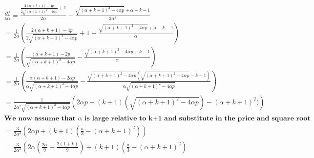 \begin{align*}
\frac{\partial f}{\partial \alpha} = \frac{\frac{2 (\alpha+k+1)-4 p}{2 \sqrt{(\alpha+k+1)^2-4 \alpha p}}+1}{2
   \alpha}-\frac{\sqrt{(\alpha+k+1)^2-4 \alpha p}+\alpha-k-1}{2 \alpha^2} \\
=\frac{1}{2 \alpha}
\left( 
\frac{2 (\alpha+k+1)-4 p}{2 \sqrt{(\alpha+k+1)^2-4 \alpha p}}+1-\frac{\sqrt{(\alpha+k+1)^2-4 \alpha p}+\alpha-k-1}{ \alpha}
\right) \\
=\frac{1}{2 \alpha}
\left( 
\frac{ (\alpha+k+1)-2 p}{ \sqrt{(\alpha+k+1)^2-4 \alpha p}}-\frac{\sqrt{(\alpha+k+1)^2-4 \alpha p}-k-1}{ \alpha}
\right) \\
=\frac{1}{2 \alpha}
\left( 
\frac{ \alpha (\alpha+k+1)-2 \alpha p}{ \alpha\sqrt{(\alpha+k+1)^2-4 \alpha p}}-\frac{\sqrt{(\alpha+k+1)^2-4 \alpha p}(\sqrt{(\alpha+k+1)^2-4 \alpha p}-k-1)}{ \alpha\sqrt{(\alpha+k+1)^2-4 \alpha p}}
\right) \\
=\frac{1}{2 \alpha^2 \sqrt{(\alpha+k+1)^2-4 \alpha p}}
\left( 
2 \alpha p+(k+1)(\sqrt{(\alpha+k+1)^2-4 \alpha p})-(\alpha+k+1)^2)
\right) \\
\textbf{We now assume that $\alpha$ is large relative to k+1 and substitute in the price and square root}
\\
=\frac{3}{2 \alpha^3 }
\left( 
2 \alpha p+(k+1)(\frac{a}{3}-(\alpha+k+1)^2)
\right) \\
=\frac{3}{2 \alpha^3 }
\left( 
2 \alpha (\frac{2\alpha}{9}+\frac{2(1+k)}{9})+(k+1)(\frac{a}{3}-(\alpha+k+1)^2)

\end{align*}
